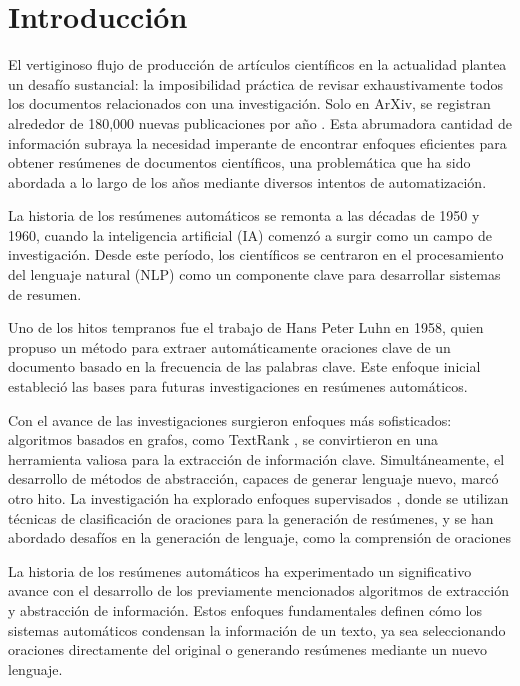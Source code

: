 \chapter*{Introducción}\label{chapter:introduction}

    El vertiginoso flujo de producción de artículos científicos en la actualidad plantea un desafío sustancial: la imposibilidad práctica de revisar exhaustivamente todos los documentos relacionados con una investigación. Solo en ArXiv, se registran alrededor de 180,000 nuevas publicaciones por año \cite{arxivstats}. Esta abrumadora cantidad de información subraya la necesidad imperante de encontrar enfoques eficientes para obtener resúmenes de documentos científicos, una problemática que ha sido abordada a lo largo de los años mediante diversos intentos de automatización.

    La historia de los resúmenes automáticos se remonta a las décadas de 1950 y 1960, cuando la inteligencia artificial (IA) comenzó a surgir como un campo de investigación. Desde este período, los científicos se centraron en el procesamiento del lenguaje natural (NLP) como un componente clave para desarrollar sistemas de resumen.

    Uno de los hitos tempranos fue el trabajo de Hans Peter Luhn en 1958\cite{luhun1958}, quien propuso un método para extraer automáticamente oraciones clave de un documento basado en la frecuencia de las palabras clave. Este enfoque inicial estableció las bases para futuras investigaciones en resúmenes automáticos.

    Con el avance de las investigaciones surgieron enfoques más sofisticados: algoritmos basados en grafos, como TextRank \cite{mihalcea2004textrank}, se convirtieron en una herramienta valiosa para la extracción de información clave. Simultáneamente, el desarrollo de métodos de abstracción, capaces de generar lenguaje nuevo, marcó otro hito. La investigación ha explorado enfoques supervisados \cite{collins-etal-2017-supervised}, donde se utilizan técnicas de clasificación de oraciones para la generación de resúmenes, y se han abordado desafíos en la generación de lenguaje, como la comprensión de oraciones \cite{knight2000statistics}

    La historia de los resúmenes automáticos ha experimentado un significativo avance con el desarrollo de los previamente mencionados algoritmos de extracción y abstracción de información. Estos enfoques fundamentales definen cómo los sistemas automáticos condensan la información de un texto, ya sea seleccionando oraciones directamente del original o generando resúmenes mediante un nuevo lenguaje.

